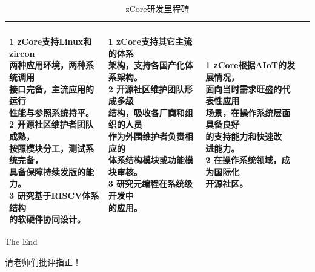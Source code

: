 \documentclass[
8pt, %
]{beamer}
\begin{document}
\begin{frame}
\begin{table}
{\begin{tabular}{l l l l}
				\makecell[l]{\\1 zCore支持Linux和zircon\\两种应用环境，两种系统调用\\接口完备，主流应用的运行\\性能与参照系统持平。\\
							 2 开源社区维护者团队成熟，\\按照模块分工，测试系统完备，\\具备保障持续发版的能力。\\
							 3 研究基于RISCV体系结构\\的软硬件协同设计。} &
				\makecell[l]{1 zCore支持其它主流的体系\\架构，支持各国产化体系架构。\\
							 2 开源社区维护团队形成多级\\结构，吸收各厂商和组织的人员\\作为外围维护者负责相应的\\体系结构模块或功能模块审核。\\
							 3 研究元编程在系统级开发中\\的应用。} &
				\makecell[l]{1 zCore根据AIoT的发展情况，\\面向当时需求旺盛的代表性应用\\场景，在操作系统层面具备良好\\的支持能力和快速改\\进能力。\\
							 2 在操作系统领域，成为国际化\\开源社区。} \\
				\bottomrule
			\end{tabular}
			}			
			\caption{zCore研发里程碑}
		\end{table}
	\end{frame}

	\begin{frame}[plain]
		\begin{center}
			{\Huge The End}
			
			\bigskip\bigskip %
			
			{\LARGE 请老师们批评指正！}
		\end{center}
	\end{frame}
\end{document}
